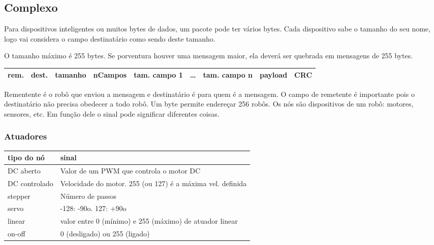 \documentclass[11pt,	 papera4]{article}
\begin{document}
\subsection{Complexo}
\label{sec-1.3}


Para dispositivos inteligentes ou muitos bytes de dados, um pacote pode ter vários bytes. Cada dispositivo sabe o tamanho do seu nome, logo vai considera o campo destinatário como sendo deste tamanho.

O tamanho máximo é 255 bytes. Se porventura houver uma mensagem maior, ela deverá ser quebrada em mensagens de 255 bytes.


\begin{center}
\begin{tabular}{lllllllll}
\hline
 rem.  &  dest.  &  tamanho  &  nCampos  &  tam. campo 1  &  \ldots{}  &  tam. campo n  &  payload  &  CRC  \\
\hline
\end{tabular}
\end{center}



Rementente é o robô que enviou a mensagem e destinatário é para quem é a mensagem. O campo de remetente é importante pois o destinatário não precisa obedecer a todo robô. Um byte permite endereçar 256 robôs.
Os nós são dispositivos de um robô: motores, sensores, etc. Em função dele o sinal pode significar diferentes coisas.

\subsubsection{Atuadores}
\label{sec-1.3.1}


\begin{center}
\begin{tabular}{ll}
\hline
 tipo do nó     &  sinal                                                       \\
\hline
 DC aberto      &  Valor de um PWM que controla o motor DC                     \\
 DC controlado  &  Velocidade do motor. 255 (ou 127) é a máxima vel. definida  \\
 stepper        &  Número de passos                                            \\
 servo          &  -128: -90o. 127: +90o                                       \\
 linear         &  valor entre 0 (mínimo) e 255 (máximo) de atuador linear     \\
 on-off         &  0 (desligado) ou 255 (ligado)                               \\
\hline
\end{tabular}
\end{center}
\end{document}
